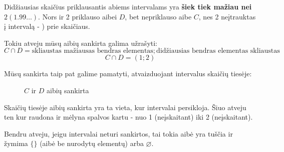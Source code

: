 \documentclass[a4paper]{article}
\newcommand{\germanqq}[1]{{\selectlanguage{german}\glqq#1\grqq\selectlanguage{english}}}
\begin{document}
Didžiausias skaičius priklausantis abiems intervalams yra \textbf{šiek tiek
      mažiau nei} $2 (1.99\ldots)$. Nors ir 2 priklauso aibei $D$, bet
nepriklauso
aibe $C$, nes 2 neįtrauktas į intervalą - \germanqq{)} prie skaičiaus.

Tokiu atveju mūsų aibių sankirta galima užrašyti:
\[  C \cap D = \text{skliaustas } \text{mažiausas bendras elementas};
      \text{didžiausias bendras elementas} \text{ skliaustas}  \]
\[  C \cap D = (1; 2)\]

Mūsų sankirta taip pat galime pamatyti, atvaizduojant intervalus skaičių
tiesėje:

\begin{figure}[!htbp]
      \centering
      \caption{$C$ ir $D$ aibių sankirta}
      \label{fig:set_intersection_example_interval}
\end{figure}

Skaičių tiesėje aibių sankirta yra ta vieta, kur intervalai persikloja. Šiuo
atveju ten kur raudona ir mėlyna spalvos kartu - nuo 1 (neįskaitant) iki 2
(neįskaitant).

Bendru atveju, jeigu intervalai neturi sankirtos, tai tokia aibė yra tuščia ir
žymima $\{\}$
(aibė be nurodytų elementų) arba $\varnothing$.
\end{document}
